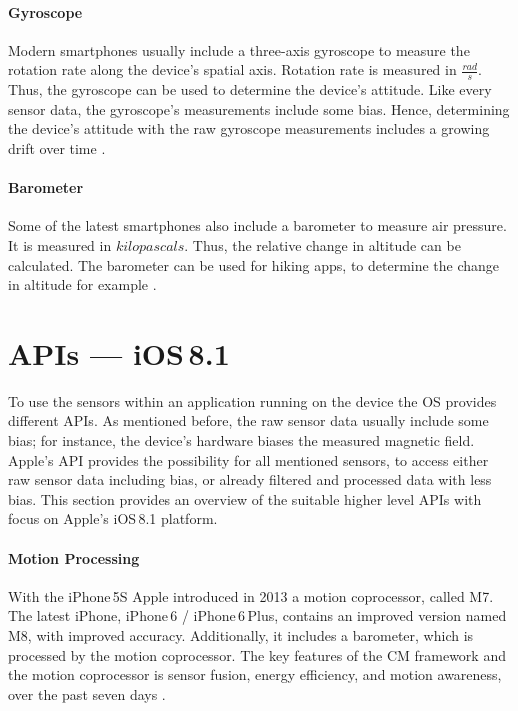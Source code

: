 \paragraph{Gyroscope}
Modern smartphones usually include a three-axis gyroscope to measure the rotation rate along the device's spatial axis. Rotation rate is measured in $\frac{rad}{s}$. Thus, the gyroscope can be used to determine the device's attitude. Like every sensor data, the gyroscope's measurements include some bias. Hence, determining the device's attitude with the raw gyroscope measurements includes a growing drift over time \citep{apple:wwdc_2012_pham,apple:ios_doc_cm}.


\paragraph{Barometer}
Some of the latest smartphones also include a barometer to measure air pressure. It is measured in $kilo pascals$. Thus, the relative change in altitude can be calculated. The barometer can be used for hiking apps, to determine the change in altitude for example \cite{apple:ios_doc_cm}.


\section{\acsp{API} --- iOS\,8.1}
To use the sensors within an application running on the device the \ac{OS} provides different \acp{API}. As mentioned before, the raw sensor data usually include some bias; for instance, the device's hardware biases the measured magnetic field. Apple's \ac{API} provides the possibility for all mentioned sensors, to access either raw sensor data including bias, or already filtered and processed data with less bias. This section provides an overview of the suitable higher level \acsp{API} with focus on Apple's iOS\,8.1 platform.


\paragraph{Motion Processing}
With the iPhone\,5S Apple introduced in 2013 a motion coprocessor, called M7. The latest iPhone, iPhone\,6 / iPhone\,6\,Plus, contains an improved version named M8, with improved accuracy. Additionally, it includes a barometer, which is processed by the motion coprocessor. The key features of the \ac{CM} framework and the motion coprocessor is sensor fusion, energy efficiency, and motion awareness, over the past seven days \citep{apple:wwdc_2014_pham}.

